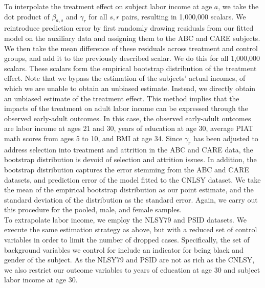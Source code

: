\noindent To interpolate the treatment effect on subject labor income at age $a$, we take the dot product
of $\beta_{a, s}$ and $\gamma_r$ for all $s,r$ pairs, resulting in 1,000,000 scalars. We reintroduce
prediction error by first randomly drawing residuals from our fitted model on the auxiliary data and assigning
them to the ABC and CARE subjects. We then take the mean difference of these residuals across treatment and control
groups, and add it to the previously described scalar. We do this for all 1,000,000 scalars. These scalars form the empirical
bootstrap distribution of the treatment effect. Note that
we bypass the estimation of the subjects' actual incomes, of which we are unable to obtain an
unbiased estimate. Instead, we directly obtain an unbiased estimate of the treatment effect. This
method implies that the impacts of the treatment on adult labor income can be expressed through
the observed early-adult outcomes. In this case, the observed early-adult outcomes are labor income at ages 21 and
30, years of education at age 30, average PIAT math scores from ages 5 to 10, and BMI at age 34. Since $\gamma_r$ has
been adjusted to address selection into treatment and attrition in the ABC and CARE data, the bootstrap distribution
is devoid of selection and attrition issues. In addition, the bootstrap distribution captures
the error stemming from the ABC and CARE datasets, and prediction error of the model fitted to the CNLSY dataset.
We take the mean of the empirical bootstrap distribution as our point estimate, and the standard deviation
of the distribution as the standard error. Again, we carry out this procedure for the
pooled, male, and female samples. \\

\noindent To extrapolate labor income, we employ the NLSY79 and PSID datasets. We execute the same estimation
strategy as above, but with a reduced set of control variables in order to limit the number
of dropped cases. Specifically, the set of background variables we control for include an indicator for
being black and gender of the subject. As the NLSY79 and PSID are not as rich as the CNLSY, we also
restrict our outcome variables to years of education at age 30 and subject labor income at age 30. \\

